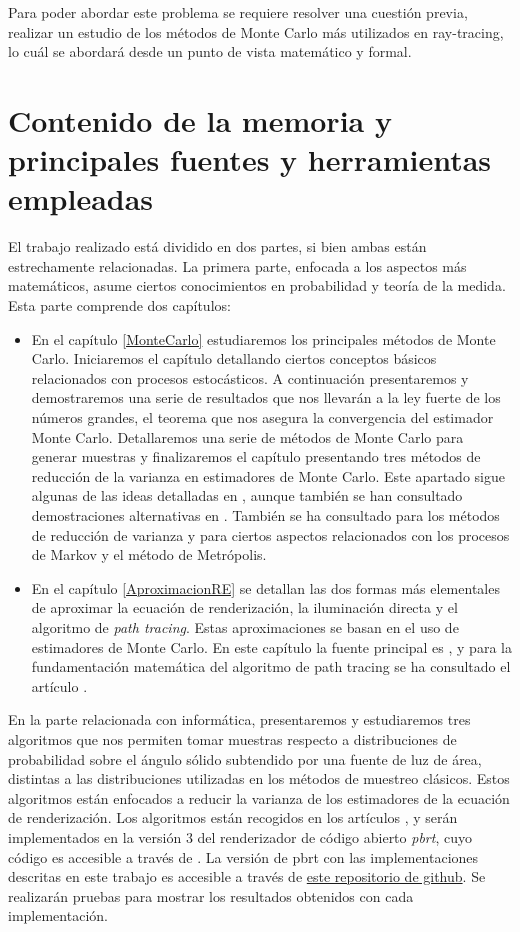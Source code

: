 Para poder abordar este problema se requiere resolver una cuestión previa, realizar un estudio de los métodos de Monte Carlo más utilizados en ray-tracing, lo cuál se abordará desde un punto de vista matemático y formal.

\section{Contenido de la memoria y principales fuentes y herramientas empleadas}
El trabajo realizado está dividido en dos partes, si bien ambas están estrechamente relacionadas. La primera parte, enfocada a los aspectos más matemáticos, asume ciertos conocimientos en probabilidad y teoría de la medida. Esta parte comprende dos capítulos:
\begin{itemize}
\item En el capítulo \ref{MonteCarlo} estudiaremos los principales métodos de Monte Carlo. Iniciaremos el capítulo detallando ciertos conceptos básicos relacionados con procesos estocásticos. A continuación presentaremos y demostraremos una serie de resultados que nos llevarán a la ley fuerte de los números grandes, el teorema que nos asegura la convergencia del estimador Monte Carlo. Detallaremos una serie de métodos de Monte Carlo para generar muestras y finalizaremos el capítulo presentando tres métodos de reducción de la varianza en estimadores de Monte Carlo. Este apartado sigue algunas de las ideas detalladas en \cite{Graham2013}, aunque también se han consultado demostraciones alternativas en \cite{Williams1991}. También se ha consultado \cite{Veach97} para los métodos de reducción de varianza y \cite{Roberts2004} para ciertos aspectos relacionados con los procesos de Markov y el método de Metrópolis.

\item En el capítulo \ref{AproximacionRE} se detallan las dos formas más elementales de aproximar la ecuación de renderización, la iluminación directa y el algoritmo de \emph{path tracing}. Estas aproximaciones se basan en el uso de estimadores de Monte Carlo. En este capítulo la fuente principal es \cite{Pharr2016}, y para la fundamentación matemática del algoritmo de path tracing se ha consultado el artículo \cite{Dimov2005}. 
\end{itemize}

En la parte relacionada con informática, presentaremos y estudiaremos tres algoritmos que nos permiten tomar muestras respecto a distribuciones de probabilidad sobre el ángulo sólido subtendido por una fuente de luz de área, distintas a las distribuciones utilizadas en los métodos de muestreo clásicos. Estos algoritmos están enfocados a reducir la varianza de los estimadores de la ecuación de renderización. Los algoritmos están recogidos en los artículos \cite{Urena2013} \cite{Urena2018} \cite{Guillen2017}, y serán implementados en la versión 3 del renderizador de código abierto \emph{pbrt}, cuyo código es accesible a través de \cite{pbrtCode}. La versión de pbrt con las implementaciones descritas en este trabajo es accesible a través de \href{https://github.com/emilio98/TFG}{este repositorio de github}. Se realizarán pruebas para mostrar los resultados obtenidos con cada implementación.

